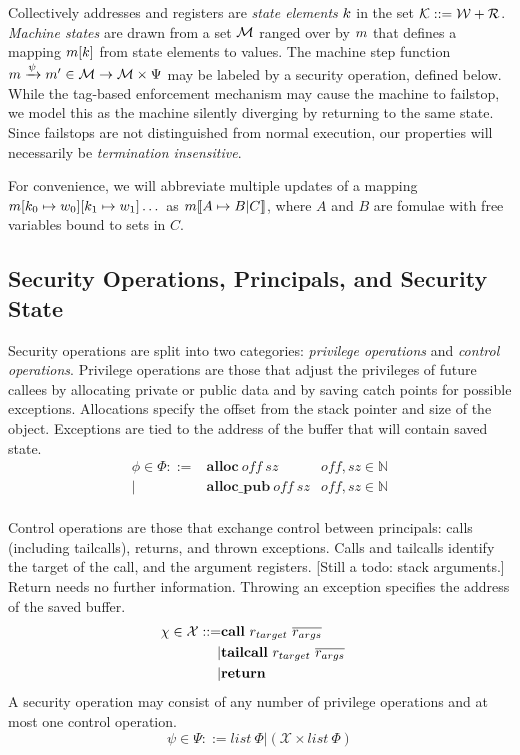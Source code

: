 \documentclass[10pt,conference]{ieeetran}%
\theoremstyle{definition}
\begin{document}
Collectively addresses and registers are {\em state elements} \(k\)
in the set \({\mathcal K} ::= {\mathcal W} + {\mathcal R}\).
%
{\em Machine states} are drawn from a set \({\mathcal M}\) ranged over by \(m\)
that defines a mapping \(m[k]\) from state elements to values.
The machine step function
\(m \xrightarrow{\psi} m' \in {\mathcal M} \rightarrow {\mathcal M} \times \Psi\)
may be labeled by a security operation, defined below.
While the tag-based enforcement mechanism may cause the machine to
failstop, we model this as the machine silently diverging by returning to the
same state. Since failstops are not distinguished from normal execution,
our properties will necessarily be {\it termination insensitive}.

For convenience, we will abbreviate multiple updates of a mapping
\(m[k_0 \mapsto w_0][k_1 \mapsto w_1]\dots\)
as \(m \llbracket A \mapsto B | C \rrbracket\), where \(A\) and \(B\)
are fomulae with free variables bound to sets in \(C\).

\subsection{Security Operations, Principals, and Security State}

Security operations are split into two categories: {\it privilege operations}
and {\it control operations}. Privilege operations are those that adjust the
privileges of future callees by allocating private or public data and by saving
catch points for possible exceptions. Allocations specify the offset from
the stack pointer and size of the object. Exceptions are tied to the address
of the buffer that will contain saved state.
%
\begin{align*}
  \phi \in \Phi ::= & \mathbf{alloc} ~ \mathit{off ~ sz} & \mathit{off, sz} \in \mathbb{N} \\
  | & \mathbf{alloc\_pub} ~ \mathit{off ~ sz} & \mathit{off, sz} \in \mathbb{N} \\
\end{align*}

Control operations are those that exchange
control between principals: calls (including tailcalls), returns, and thrown
exceptions. Calls and tailcalls identify the target of the call, and the argument registers.
[Still a todo: stack arguments.] Return needs no further information. Throwing
an exception specifies the address of the saved buffer.
%
\begin{align*}
  \chi \in \mathcal{X} ::= & \mathbf{call} ~ r_{target} ~ \overline{r_{args}} & \\
  | & \mathbf{tailcall} ~ r_{target} ~ \overline{r_{args}} & \\
  | & \mathbf{return} & \\
\end{align*}
%
A security operation may consist of any number of privilege operations and at most
one control operation.
%
\[\psi \in \Psi ::= \mathit{list ~ \Phi} | (\mathcal{X} \times \mathit{list ~ \Phi})\]
\end{document}
